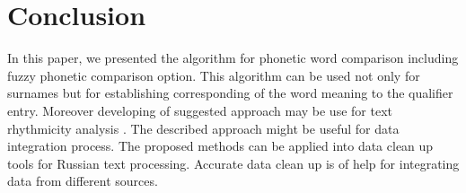 \documentclass[conference,a4paper]{IEEEtran}
\begin{document}
%






\section{Conclusion}
In this paper, we presented the algorithm for phonetic word comparison including fuzzy phonetic comparison option. This algorithm can be used not only for surnames but for establishing corresponding of the word meaning to the qualifier entry. Moreover developing of suggested approach may be use for text rhythmicity analysis \cite{Damasevichius}. The described approach might be useful for data integration process. The proposed methods can be applied into data clean up tools for Russian text processing. Accurate data clean up is of help for integrating data from different sources.
\end{document}
